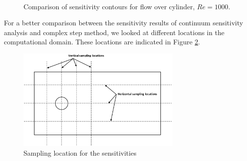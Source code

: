 \documentclass[12pt]{aiaa-pretty}
\begin{document}
\begin{figure}[H]
{	}
	\\
	\quad
	\caption{Comparison of sensitivity contours for flow over cylinder, $Re = 1000$.}
	\label{fig:cylinderSensitivityContourRE1000}
\end{figure}
%

For a better comparison between the sensitivity results of continuum sensitivity analysis and complex step method, we looked at different locations in the computational domain. These locations are indicated in Figure \ref{fig:cylinderSampleLocations}.

%
\begin{figure}[H]
	\centering
	\includegraphics[height=5.0cm]{figure/cylinder/sampling_location.png}
	\caption{Sampling location for the sensitivities}
	\label{fig:cylinderSampleLocations}
\end{figure}
%
\end{document}
